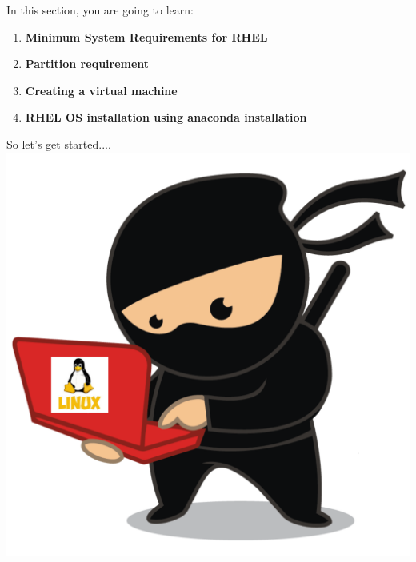 \setlength{\columnsep}{3pt}
\begin{flushleft}
	\bigskip
	\bigskip
	\begin{tcolorbox}[breakable,notitle,boxrule=1pt,colback=black,colframe=black]
		\color{white}
		\bigskip
		In this section, you are going to learn:
		\begin{enumerate}
			\item \textbf{Minimum System Requirements for RHEL}
			\item \textbf{Partition requirement}
			\item \textbf{Creating a virtual machine}
			\item \textbf{RHEL OS installation using anaconda installation}
		\end{enumerate}	
		\bigskip
		\bigskip
	\end{tcolorbox}
	
	
	\begin{multicols}{2}
		\vspace*{\fill}
		\vspace*{\fill}
		\vspace*{\fill}
		\vspace*{\fill}
		\vspace*{\fill}
		\vspace*{\fill}
		\vspace*{\fill}
		\vspace*{\fill}
		\vspace*{\fill}
		
		\vfill \null
		\columnbreak
		So let's get started....
		\includegraphics[scale=0.08]{content/linux_section.png}
	\end{multicols}	
	
\end{flushleft}

\newpage

